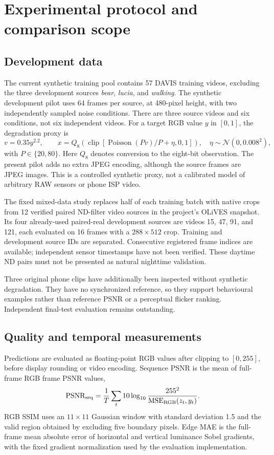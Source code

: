 \section{Experimental protocol and comparison scope}
\label{sec:protocol}
\subsection{Development data}
The current synthetic training pool contains 57 DAVIS training videos,
excluding the three development sources \emph{bear}, \emph{lucia}, and
\emph{walking}. The synthetic development pilot uses 64 frames per source,
at 480-pixel height, with two independently sampled noise conditions.
There are three source videos and six conditions, not six independent videos.
For a target RGB value $y$ in $[0,1]$, the degradation proxy is
\[
 v=0.35y^{2.2},\qquad
 x=Q_8\!\left(\operatorname{clip}
 \left[\operatorname{Poisson}(Pv)/P+\eta,0,1\right]\right),
 \quad \eta\sim\mathcal N(0,0.008^2),
\]
with $P\in\{20,80\}$. Here $Q_8$ denotes conversion to the eight-bit
observation. The present pilot adds no extra JPEG encoding, although the
source frames are JPEG images. This is a controlled synthetic proxy, not
a calibrated model of arbitrary RAW sensors or phone ISP video.

The fixed mixed-data study replaces half of each training batch with
native crops from 12 verified paired ND-filter video sources in the
project's OLiVES snapshot. Its four already-used paired-real development
sources are videos 15, 47, 91, and 121, each evaluated on 16 frames with a
$288\!\times\!512$ crop. Training and development source IDs are separated.
Consecutive registered frame indices are available; independent sensor
timestamps have not been verified. These daytime ND pairs must not be
presented as natural nighttime validation.

Three original phone clips have additionally been inspected without
synthetic degradation. They have no synchronized reference, so they support
behavioural examples rather than reference PSNR or a perceptual flicker
ranking. Independent final-test evaluation remains outstanding.

\subsection{Quality and temporal measurements}
Predictions are evaluated as floating-point RGB values after clipping to
$[0,255]$, before display rounding or video encoding. Sequence PSNR is the
mean of full-frame RGB frame PSNR values,
\[
 \operatorname{PSNR}_{\rm seq}
 =\frac1T\sum_t 10\log_{10}
 \frac{255^2}{\operatorname{MSE}_{\rm RGB}(z_t,y_t)}.
\]
RGB SSIM uses an $11\!\times\!11$ Gaussian window with standard deviation
1.5 and the valid region obtained by excluding five boundary pixels.
Edge MAE is the full-frame mean absolute error of horizontal and vertical
luminance Sobel gradients, with the fixed gradient normalization used by
the evaluation implementation.

